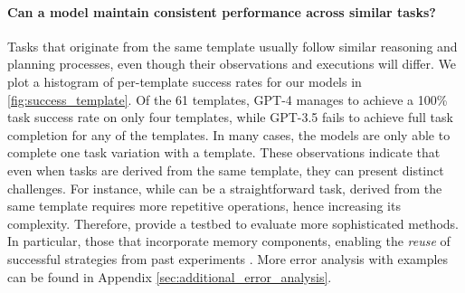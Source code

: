 \documentclass{article}
\begin{document}
\paragraph{Can a model maintain consistent performance across similar tasks?} Tasks that originate from the same template usually follow similar reasoning and planning processes, even though their observations and executions will differ.
We plot a histogram of per-template success rates for our models in \autoref{fig:success_template}. 
Of the 61 templates, \textsc{GPT-4} manages to achieve a 100\% task success rate on only four templates, while \textsc{GPT-3.5} fails to achieve full task completion for any of the templates. In many cases, the models are only able to complete one task variation with a template.  
These observations indicate that even when tasks are derived from the same template, they can present distinct challenges. 
For instance, while  can be a straightforward task,  derived from the same template requires more repetitive operations, hence increasing its complexity.
Therefore, \ours provide a testbed to evaluate more sophisticated methods. In particular, those that incorporate memory components, enabling the \emph{reuse} of successful strategies from past experiments \cite{zhou2021hierarchical, wang2023voyager}.
More error analysis with examples can be found in Appendix \ref{sec:additional_error_analysis}.
\end{document}
